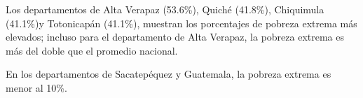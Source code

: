 Los departamentos de Alta Verapaz (53.6\%), Quiché (41.8\%), Chiquimula (41.1\%)y Totonicapán (41.1\%), muestran los porcentajes de pobreza extrema más elevados;  incluso para el departamento de Alta Verapaz, la pobreza extrema es más del doble que el promedio nacional.  
 
En los departamentos de Sacatepéquez y Guatemala, la pobreza extrema es menor al 10\%.